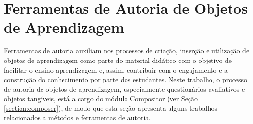 


\section{Ferramentas de Autoria de Objetos de Aprendizagem}
\label{sec:autoria}

Ferramentas de autoria auxiliam nos processos de criação, inserção e utilização de objetos de aprendizagem como parte do material didático com o objetivo de facilitar o ensino-aprendizagem e, assim, contribuir com o engajamento e a construção do conhecimento por parte dos estudantes. Neste trabalho, o processo de autoria de objetos de aprendizagem, especialmente questionários avaliativos e objetos tangíveis, está a cargo do módulo Compositor (ver Seção \ref{section:composer}), de modo que esta seção apresenta alguns trabalhos relacionados a métodos e ferramentas de autoria.

